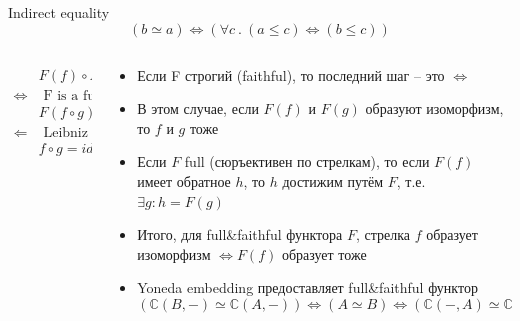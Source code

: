 \documentclass[
  russian,
  aspectratio=169,
  xcolor={svgnames},
  hyperref={colorlinks,citecolor=DeepPink4,linkcolor=DarkRed,urlcolor=DarkBlue}]{beamer}
\begin{document}
\begin{frame}[fragile]{Indirect equality}
$$
(b \simeq a) \Leftrightarrow (\forall c\ .\ (a \leqslant c) \Leftrightarrow (b \leqslant c))
$$\vspace{0.5cm}

\begin{minipage}[0.2\textheight]{\textwidth}
\begin{columns}[T]
\begin{column}{0.2\textwidth}
\begin{align*}
                & F(f) \circ F(g) = id \\
\Leftrightarrow & \text { F is a functor } \\
                & F(f \circ g) = F(id) \\
\Leftarrow      & \text { Leibniz } \\
                & f \circ g= id
\end{align*}
\end{column}
\begin{column}{0.8\textwidth}
\begin{itemize}%
\item Если F строгий (faithful), то последний шаг -- это 
$\Leftrightarrow$
\item В этом случае, если $F(f)$ и $F(g)$ образуют изоморфизм, то $f$ и $g$ тоже
\item Если $F$ full (сюръективен по стрелкам), то если $F(f)$ имеет обратное $h$, то $h$ достижим путём $F$, т.е. $\exists g : h=F(g)$ 
\item Итого, для full\&faithful функтора $F$, стрелка $f$ образует изоморфизм $\Leftrightarrow F(f)$ образует тоже
\item Yoneda embedding предоставляет full\&faithful функтор
$$
(\mathbb{C}(B,-) \simeq \mathbb{C}(A,-)) \Leftrightarrow
(A\simeq B) \Leftrightarrow
(\mathbb{C}(-,A) \simeq \mathbb{C}(-,B))
$$

\end{itemize}
\end{column}
\end{columns}
\end{minipage}
\end{frame}
\end{document}
